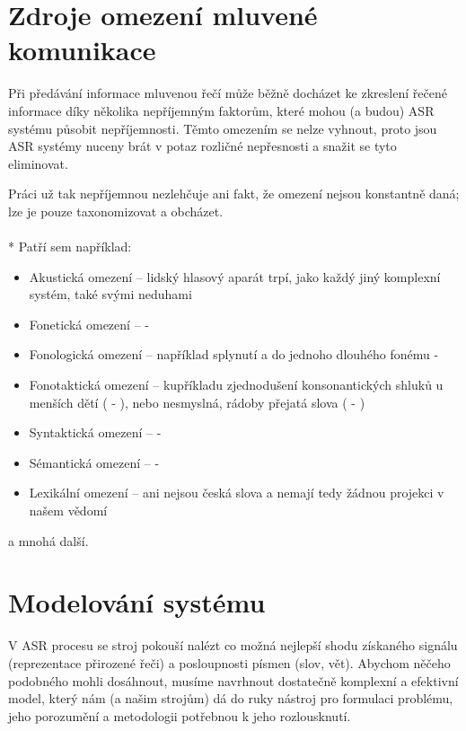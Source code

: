 \section{Zdroje omezení mluvené komunikace}

Při předávání informace mluvenou řečí může běžně docházet ke zkreslení řečené informace díky několika nepříjemným faktorům, které mohou (a budou) ASR systému působit nepříjemnosti. Těmto omezením se nelze vyhnout, proto jsou ASR systémy nuceny brát v potaz rozličné nepřesnosti a snažit se tyto eliminovat.

Práci už tak nepříjemnou nezlehčuje ani fakt, že omezení nejsou konstantně daná; lze je pouze taxonomizovat a obcházet.
\\\\*
Patří sem například:

\begin{itemize}
\item Akustická omezení -- lidský hlasový aparát trpí, jako každý jiný komplexní systém, také svými neduhami
\item Fonetická omezení --  - 
\item Fonologická omezení -- například splynutí  a  do jednoho dlouhého fonému - 
\item Fonotaktická omezení -- kupříkladu zjednodušení konsonantických shluků u menších dětí ( - ), nebo nesmyslná, rádoby přejatá slova ( - )
\item Syntaktická omezení --  - 
\item Sémantická omezení --  - 
\item Lexikální omezení --  ani  nejsou česká slova a nemají tedy žádnou projekci v našem vědomí
\end{itemize}

a mnohá další.

\section{Modelování systému}

V ASR procesu se stroj pokouší nalézt co možná nejlepší shodu získaného signálu (reprezentace přirozené řeči) a posloupnosti písmen (slov, vět). Abychom něčeho podobného mohli dosáhnout, musíme navrhnout dostatečně komplexní a efektivní model, který nám (a našim strojům) dá do ruky nástroj pro formulaci problému, jeho porozumění a metodologii potřebnou k jeho rozlousknutí.

